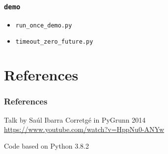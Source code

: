\documentclass[compress,usenames,dvipsnames]{beamer}
\begin{document}
\begin{frame}[plain]
    \frametitle{\lstinline{demo}}
    \begin{itemize}
        \item \lstinline{run_once_demo.py}
        \item \lstinline{timeout_zero_future.py}
    \end{itemize}

\end{frame}

\section{References}
\begin{frame}\frametitle{References}
    \begin{thebibliography}{9}
        Talk by Saúl Ibarra Corretgé in PyGrunn 2014
        \url{https://www.youtube.com/watch?v=HppNu0-ANYw} 
    \end{thebibliography}
    Code based on Python 3.8.2
\end{frame}
\end{document}
